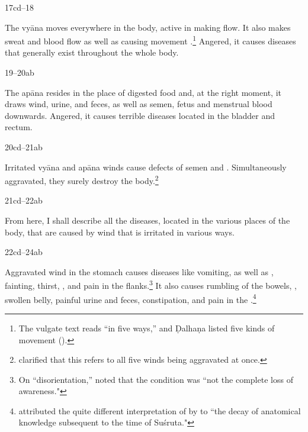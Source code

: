 \begin{translation}
\item[17cd--18] 

	The vyāna moves everywhere in the body, active in making
	 flow.   It also makes sweat and blood flow as well as
	causing movement .\footnote{The vulgate text
	reads  “in five ways,” and Ḍalhaṇa listed five kinds of
	 movement ().} Angered, it  causes diseases that
	generally exist throughout the whole body.
    

    
    \item [19--20ab]
    
	The apāna resides in the place of digested food and, at the right
	moment, it draws  wind, urine, and feces, as well as semen, fetus and
	 menstrual blood downwards.  Angered, it causes terrible diseases
	 located in the bladder and rectum.

\item[20cd--21ab]

	Irritated  vyāna and apāna winds cause defects of semen and
	.  Simultaneously aggravated, they surely
	destroy the body.\footnote{ clarified that this
	refers to all five winds being aggravated at once.}


	\bigskip

\item[21cd--22ab] 

	From here, I shall describe all the diseases, located in the various
	places of the body, that are caused by wind that is irritated in various
	ways.

\item[22cd--24ab] 

	Aggravated wind in the stomach causes diseases like vomiting, as well
as , fainting, thirst,
, and pain in the flanks.\footnote{On
    “disorientation,”  noted that the condition
    was  “not the complete loss of
    awareness."} It also causes rumbling of the bowels,
    , swollen belly, painful urine and feces,
    constipation, and pain in the
    .\footnote{\citet[140]{hoer-1907} attributed the
        quite different interpretation of  by
         to “the  decay of anatomical knowledge
        subsequent to the time of Suśruta."}


\end{translation}
